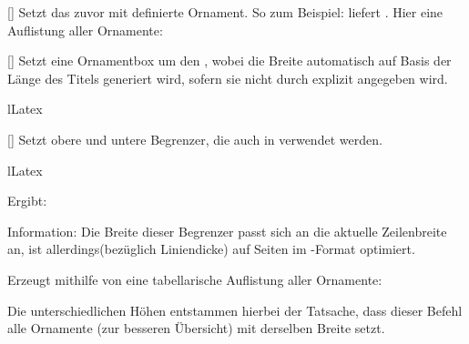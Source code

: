 %
%
%

[]
Setzt das zuvor mit  definierte Ornament. So zum Beispiel:  liefert \ornalion.\newline
Hier eine Auflistung aller Ornamente:
\getRegisteredOrnaments%
\expandafter\typesetList[T]{\lillyxlist}

%
%
%

[]
Setzt eine Ornamentbox um den , wobei die Breite automatisch auf Basis der Länge des Titels generiert wird, sofern sie nicht durch  explizit angegeben wird.
\begin{defaultlst}[][listing side text,righthand width=7cm]{lLatex}
\begin{center}
\end{center}
\end{defaultlst}

%
%
%

[\secline{}\cmdlist{}]
Setzt obere und untere Begrenzer, die auch in  verwendet werden.
\begin{defaultlst}{lLatex}

\end{defaultlst}
Ergibt:\\

Information: Die Breite dieser Begrenzer passt sich an die aktuelle Zeilenbreite an, ist allerdings(bezüglich Liniendicke) auf Seiten im -Format optimiert.

%
%
%

Erzeugt mithilfe von  eine tabellarische Auflistung aller Ornamente:
\begin{tcbraster}[raster columns=4, blankest, graphics pages={1,2,6}, colback=white]
\end{tcbraster}
Die unterschiedlichen Höhen entstammen hierbei der Tatsache, dass dieser Befehl alle Ornamente (zur besseren Übersicht) mit derselben Breite setzt.

